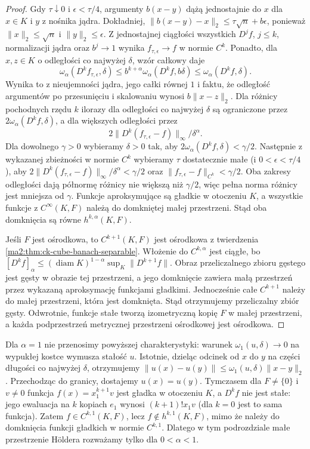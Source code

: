 \begin{proof}
Gdy $\tau\downarrow0$ i $\epsilon<\tau/4$,
argumenty $b(x-y)$ dążą jednostajnie do $x$
dla $x\in K$ i $y$ z nośnika jądra. Dokładniej,
$\|b(x-y)-x\|_2\le\tau\sqrt n+b\epsilon$,
ponieważ $\|x\|_2\le\sqrt n$ i $\|y\|_2\le\epsilon$.
Z jednostajnej ciągłości wszystkich $D^jf$,
$j\le k$, normalizacji jądra oraz $b^j\to1$
wynika $f_{\tau,\epsilon}\to f$ w normie $C^k$.
Ponadto, dla $x,z\in K$ o odległości
co najwyżej $\delta$, wzór całkowy daje
\[
 \omega_\alpha(D^kf_{\tau,\epsilon},\delta)
 \le b^{k+\alpha}\omega_\alpha(D^kf,b\delta)
 \le\omega_\alpha(D^kf,\delta).
\]
Wynika to z nieujemności jądra, jego
całki równej $1$ i faktu, że odległość
argumentów po przesunięciu i skalowaniu
wynosi $b\|x-z\|_2$.
Dla różnicy pochodnych rzędu $k$ ilorazy
dla odległości co najwyżej $\delta$ są
ograniczone przez $2\omega_\alpha(D^kf,\delta)$,
a dla większych odległości przez
\[
 2\|D^k(f_{\tau,\epsilon}-f)\|_\infty/\delta^\alpha.
\]
Dla dowolnego $\gamma>0$ wybieramy $\delta>0$ tak,
aby $2\omega_\alpha(D^kf,\delta)<\gamma/2$.
Następnie z wykazanej zbieżności w normie $C^k$
wybieramy $\tau$ dostatecznie małe (i $0<\epsilon<\tau/4$),
aby $2\|D^k(f_{\tau,\epsilon}-f)\|_\infty/\delta^\alpha<\gamma/2$
oraz $\|f_{\tau,\epsilon}-f\|_{C^k}<\gamma/2$.
Oba zakresy odległości dają półnormę różnicy
nie większą niż $\gamma/2$, więc pełna norma różnicy
jest mniejsza od $\gamma$. Funkcje aproksymujące są
gładkie w otoczeniu $K$, a wszystkie funkcje z
$C^\infty(K,F)$ należą do domkniętej małej przestrzeni.
Stąd oba domknięcia są równe $h^{k,\alpha}(K,F)$.

Jeśli $F$ jest ośrodkowa, to $C^{k+1}(K,F)$
jest ośrodkowa z twierdzenia
\ref{ma2:thm:ck-cube-banach-separable}.
Włożenie do $C^{k,\alpha}$ jest ciągłe,
bo $[D^kf]_\alpha\le
(\operatorname{diam}K)^{1-\alpha}\sup_K\|D^{k+1}f\|$.
Obraz przeliczalnego zbioru gęstego jest
gęsty w obrazie tej przestrzeni, a jego
domknięcie zawiera małą przestrzeń przez
wykazaną aproksymację funkcjami gładkimi.
Jednocześnie całe $C^{k+1}$ należy do
małej przestrzeni, która jest domknięta.
Stąd otrzymujemy przeliczalny zbiór gęsty.
Odwrotnie, funkcje stałe tworzą izometryczną
kopię $F$ w małej przestrzeni, a każda
podprzestrzeń metrycznej przestrzeni ośrodkowej
jest ośrodkowa.
\end{proof}

Dla $\alpha=1$ nie przenosimy powyższej
charakterystyki: warunek
$\omega_1(u,\delta)\to0$ na wypukłej kostce
wymusza stałość $u$. Istotnie, dzieląc
odcinek od $x$ do $y$ na części długości
co najwyżej $\delta$, otrzymujemy
$\|u(x)-u(y)\|\le\omega_1(u,\delta)\|x-y\|_2$.
Przechodząc do granicy, dostajemy $u(x)=u(y)$.
Tymczasem dla $F\ne\{0\}$ i $v\ne0$ funkcja
$f(x)=x_1^{k+1}v$ jest gładka w otoczeniu $K$,
a $D^kf$ nie jest stałe: jego ewaluacja na $k$
kopiach $e_1$ wynosi $(k+1)!x_1v$ (dla $k=0$
jest to sama funkcja). Zatem $f\in C^{k,1}(K,F)$,
lecz $f\notin h^{k,1}(K,F)$, mimo że należy
do domknięcia funkcji gładkich w normie $C^{k,1}$. Dlatego w tym
podrozdziale małe przestrzenie H\"oldera
rozważamy tylko dla $0<\alpha<1$.

